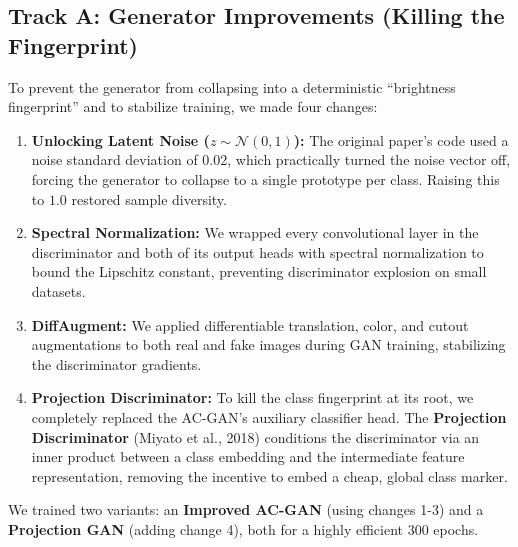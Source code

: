 \documentclass[11pt]{article}
\begin{document}
\subsection{Track A: Generator Improvements (Killing the Fingerprint)}
To prevent the generator from collapsing into a deterministic ``brightness fingerprint'' and to stabilize training, we made four changes:
\begin{enumerate}[nosep, leftmargin=1.5em]
  \item \textbf{Unlocking Latent Noise ($z \sim \mathcal{N}(0, 1)$):} The original paper's code used a noise standard deviation of $0.02$, which practically turned the noise vector off, forcing the generator to collapse to a single prototype per class. Raising this to $1.0$ restored sample diversity.
  \item \textbf{Spectral Normalization:} We wrapped every convolutional layer in the discriminator and both of its output heads with spectral normalization to bound the Lipschitz constant, preventing discriminator explosion on small datasets.
  \item \textbf{DiffAugment:} We applied differentiable translation, color, and cutout augmentations to both real and fake images during GAN training, stabilizing the discriminator gradients.
  \item \textbf{Projection Discriminator:} To kill the class fingerprint at its root, we completely replaced the AC-GAN's auxiliary classifier head. The \textbf{Projection Discriminator} (Miyato et al., 2018) conditions the discriminator via an inner product between a class embedding and the intermediate feature representation, removing the incentive to embed a cheap, global class marker.
\end{enumerate}

We trained two variants: an \textbf{Improved AC-GAN} (using changes 1-3) and a \textbf{Projection GAN} (adding change 4), both for a highly efficient 300 epochs.
\end{document}
